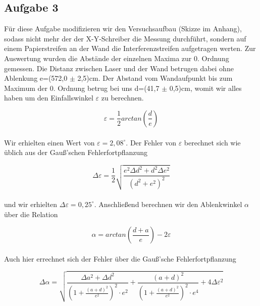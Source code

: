 \documentclass{article}
\begin{document}


\subsection{Aufgabe 3}

Für diese Aufgabe modifizieren wir den Versuchsaufbau (Skizze im Anhang), sodass nicht mehr der der X-Y-Schreiber die Messung durchführt, sondern auf einem Papierstreifen an der Wand die Interferenzstreifen aufgetragen werten. Zur Auswertung wurden die Abstände der einzelnen Maxima zur 0. Ordnung gemessen. Die Distanz zwischen Laser und der Wand betrugen dabei ohne Ablenkung e=(572,0 \(\pm\) 2,5)cm. Der Abstand vom Wandaufpunkt bis zum Maximum der 0. Ordnung betrug bei uns d=(41,7 \(\pm \) 0,5)cm, womit wir alles haben um den Einfallswinkel \(\varepsilon \) zu berechnen.

\begin{equation}
\varepsilon = \frac {1}{2} arctan \left( \frac {d}{e} \right ) 
\end{equation} \\

Wir erhielten einen Wert von \(\varepsilon = 2,08 ^\circ \). Der Fehler von \(\varepsilon \) berechnet sich wie üblich aus der Gauß'schen Fehlerfortpflanzung

\begin{equation}
\Delta \varepsilon = \frac {1}{2} \sqrt { \frac {e^2 \Delta d^2 +d^2 \Delta e^2}{ (d^2 +e^2) ^2}}
\end{equation} \\

und wir erhielten \(\Delta \varepsilon =0,25 ^\circ \). Anschließend berechnen wir den Ablenkwinkel \(\alpha \) über die Relation

\begin{equation}
\alpha = arctan \left ( \frac {d+a}{e} \right ) -2 \varepsilon
\end{equation} \\

Auch hier errechnet sich der Fehler über die Gauß'sche Fehlerfortpflanzung

\begin{equation}
\Delta \alpha = \sqrt { \frac { \Delta a^2 + \Delta d^2 }{ \left (1+ \frac{ (a+d)^2}{e^2} \right )^2 \cdot e^2}+ \frac { (a+d)^2}{ \left (1+ \frac{(a+d)^2}{e^2} \right )^2 \cdot e^4} +4 \Delta \varepsilon ^2}
\end{equation} \\
\end{document}
